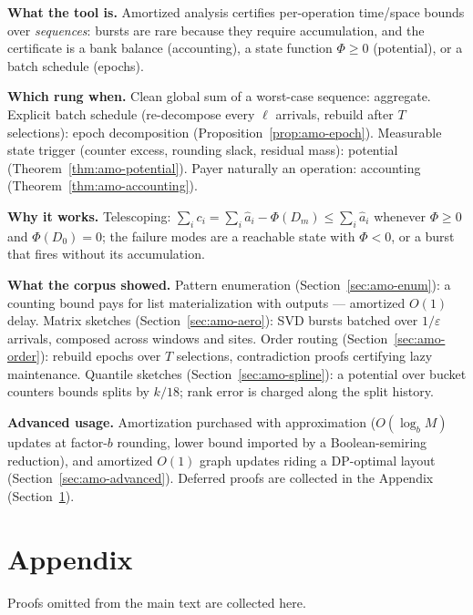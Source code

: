 \begin{recap}
\item \textbf{What the tool is.} Amortized analysis certifies per-operation
  time/space bounds over \emph{sequences}: bursts are rare because they
  require accumulation, and the certificate is a bank balance (accounting),
  a state function $\Phi \ge 0$ (potential), or a batch schedule (epochs).
\item \textbf{Which rung when.} Clean global sum of a worst-case sequence:
  aggregate. Explicit batch schedule (re-decompose every $\ell$ arrivals,
  rebuild after $T$ selections): epoch decomposition
  (Proposition~\ref{prop:amo-epoch}). Measurable state trigger (counter
  excess, rounding slack, residual mass): potential
  (Theorem~\ref{thm:amo-potential}). Payer naturally an operation:
  accounting (Theorem~\ref{thm:amo-accounting}).
\item \textbf{Why it works.} Telescoping: $\sum_i c_i = \sum_i \hat{a}_i -
  \Phi(D_m) \le \sum_i \hat{a}_i$ whenever $\Phi \ge 0$ and $\Phi(D_0) = 0$;
  the failure modes are a reachable state with $\Phi < 0$, or a burst that
  fires without its accumulation.
\item \textbf{What the corpus showed.} Pattern enumeration
  (Section~\ref{sec:amo-enum}): a counting bound pays for list
  materialization with outputs --- amortized $O(1)$ delay. Matrix sketches
  (Section~\ref{sec:amo-aero}): SVD bursts batched over $1/\varepsilon$
  arrivals, composed across windows and sites. Order routing
  (Section~\ref{sec:amo-order}): rebuild epochs over $T$ selections,
  contradiction proofs certifying lazy maintenance. Quantile sketches
  (Section~\ref{sec:amo-spline}): a potential over bucket counters bounds
  splits by $k/18$; rank error is charged along the split history.
\item \textbf{Advanced usage.} Amortization purchased with approximation
  ($O(\log_b M)$ updates at factor-$b$ rounding, lower bound imported by a
  Boolean-semiring reduction), and amortized $O(1)$ graph updates riding a
  DP-optimal layout (Section~\ref{sec:amo-advanced}). Deferred proofs are
  collected in the Appendix (Section~\ref{sec:amo-appendix}).
\end{recap}

\section{Appendix}
\label{sec:amo-appendix}

Proofs omitted from the main text are collected here.

